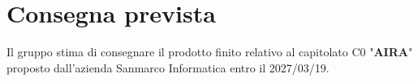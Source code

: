 \section{Consegna prevista}
Il gruppo stima di consegnare il prodotto finito relativo al capitolato C0 "\textbf{AIRA}" proposto dall'azienda Sanmarco Informatica entro il 2027/03/19.

